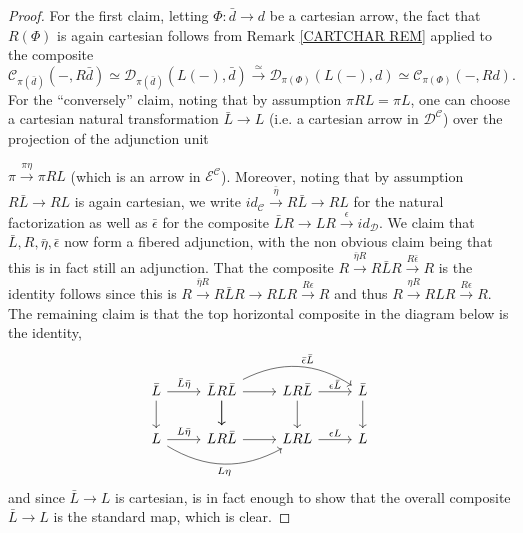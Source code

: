 \documentclass[a4paper,10pt
,draft
]{article}%
\numberwithin{equation}{section}
\numberwithin{figure}{section}
\theoremstyle{definition} %
\newcommand{\1}{\ensuremath{\mathbbm 1}}%
\begin{document}
\begin{proof}
For the first claim, 
letting $\Phi \colon \bar{d} \to d$ be a cartesian arrow, 
the fact that $R(\Phi)$ is again cartesian follows from
Remark \ref{CARTCHAR REM} applied to the composite
\[
\mathcal{C}_{\pi(\bar{d})}
	\left(-,R\bar{d}\right)
	\simeq 
\mathcal{D}_{\pi(\bar{d})}
	\left(L(-),\bar{d}\right)
	\xrightarrow{\simeq}
\mathcal{D}_{\pi(\Phi)}\left(L(-),d\right)
	\simeq
\mathcal{C}_{\pi(\Phi)}\left(-,Rd\right).
\]
For the ``conversely'' claim,
noting that by assumption $\pi RL = \pi L$,
one can choose a cartesian natural transformation $\bar{L} \to L$
(i.e. a cartesian arrow in $\mathcal{D}^{\mathcal{C}}$)
over the projection of the adjunction unit

$\pi \xrightarrow{\pi \eta} \pi RL$
(which is an arrow in $\mathcal{E}^{\mathcal{C}}$).
Moreover, noting that by assumption
$R\bar{L} \to RL$ is again cartesian, we write
$id_{\mathcal{C}} \xrightarrow{\bar{\eta}} R \bar{L} \to RL$
for the natural factorization
as well as $\bar{\epsilon}$ for the composite
$\bar{L}R \to LR \xrightarrow{\epsilon} id_{\mathcal{D}}$.
We claim that $\bar{L},R,\bar{\eta},\bar{\epsilon}$
now form a fibered adjunction, with the non obvious claim being that this is in fact still an adjunction.
That the composite
$R\xrightarrow{\bar{\eta}R} R\bar{L}R \xrightarrow{R\bar{\epsilon}} R$
is the identity follows since this is 
$R \xrightarrow{\bar{\eta} R} R\bar{L}R \to RLR \xrightarrow{R \epsilon} R$ and thus
$R \xrightarrow{\eta R} RLR \xrightarrow{R \epsilon} R$.
The remaining claim is that the top horizontal composite in the diagram below is the identity, 
\begin{equation}
\begin{tikzcd}
		\bar{L} \arrow[d] \arrow{r}{\bar{L}\bar{\eta}}
	&
		\bar{L} R \bar{L} \arrow[d] \ar{r} \ar{d}
		\arrow[bend left]{rr}{\bar{\epsilon}\bar{L}}
	&
		L R \bar{L} \ar{r}{\epsilon \bar{L}} \ar{d}
	&
		\bar{L} \ar {d}
\\
		L \arrow{r}{L\bar{\eta}}
		\arrow[bend right]{rr}[swap]{L \eta}
	&
		LR\bar{L} \ar{r}
	&
		LRL \ar{r}{\epsilon L}
	&
		L
\end{tikzcd}
\end{equation}
and since 
$\bar{L} \to L$ is cartesian, 
is in fact enough to show that the overall composite $\bar{L} \to L$
is the standard map, which is clear. 
\end{proof}
\end{document}
